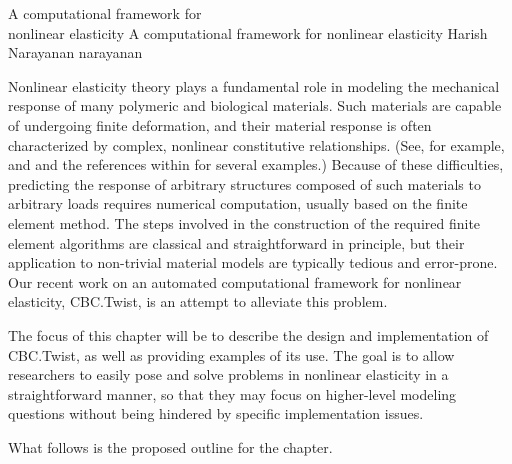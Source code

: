 \begingroup

\setcounter{chapter}{26}
\setcounter{chpnum}{26}

\def\bone{{1}}
\def\Bepsilon{\mbox{$\epsilon$}}
\def\Bvarphi{\mbox{$\varphi$}}
\def\bB{\mbox{$ B$}}
\def\bC{\mbox{$ C$}}
\def\bE{\mbox{$ E$}}
\def\bF{\mbox{$ F$}}
\def\bN{\mbox{$ N$}}
\def\bP{\mbox{$ P$}}
\def\bS{\mbox{$ S$}}
\def\bT{\mbox{$ T$}}
\def\bX{\mbox{$ X$}}
\def\ba{\mbox{$ a$}}
\def\bb{\mbox{$ b$}}
\def\be{\mbox{$ e$}}
\def\bg{\mbox{$ g$}}
\def\br{\mbox{$ r$}}
\def\bu{\mbox{$ u$}}
\def\bv{\mbox{$ v$}}
\def\bw{\mbox{$ w$}}
\def\twist{CBC.Twist}

              {A computational framework for \\ nonlinear elasticity}
              {A computational framework for nonlinear elasticity}
              {Harish Narayanan}
              {narayanan}


Nonlinear elasticity theory plays a fundamental role in modeling the
mechanical response of many polymeric and biological materials. Such
materials are capable of undergoing finite deformation, and their
material response is often characterized by complex, nonlinear
constitutive relationships. (See, for example, \citet{Holzapfel2000}
and \citet{TruesdellNoll1965} and the references within for several
examples.) Because of these difficulties, predicting the response of
arbitrary structures composed of such materials to arbitrary loads
requires numerical computation, usually based on the finite element
method. The steps involved in the construction of the required finite
element algorithms are classical and straightforward in principle, but
their application to non-trivial material models are typically tedious
and error-prone. Our recent work on an automated computational
framework for nonlinear elasticity, \twist, is an attempt to alleviate
this problem.

The focus of this chapter will be to describe the design and
implementation of \twist, as well as providing examples of its
use. The goal is to allow researchers to easily pose and solve
problems in nonlinear elasticity in a straightforward manner, so that
they may focus on higher-level modeling questions without being
hindered by specific implementation issues.

What follows is the proposed outline for the chapter.

